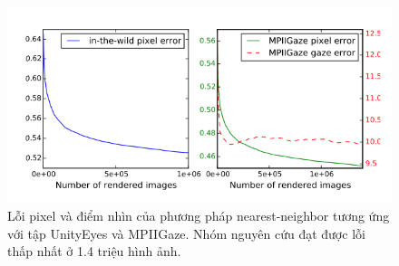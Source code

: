 \begin{center}
    \begin{figure}[h!]
    \begin{center}
     \includegraphics[scale=1]{img/Pixel_and_gaze_errors_for_nearest_neighbor.png}
    \end{center}
    \caption{Lỗi pixel và điểm nhìn của phương pháp nearest-neighbor tương ứng với tập UnityEyes và MPIIGaze. Nhóm nguyên cứu đạt được lỗi thấp nhất ở 1.4 triệu hình ảnh.}
    \label{refhinh15}
    \end{figure}
\end{center}


\newpage



